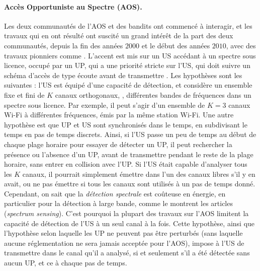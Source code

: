 \begin{resume_fr}
\paragraph{Accès Opportuniste au Spectre (AOS).}
%
Les deux communautés de l'AOS et des bandits ont commencé à interagir, et les travaux qui en ont résulté ont suscité un grand intérêt de la part des deux communautés, depuis la fin des années $2000$ et le début des années $2010$, avec des travaux pionniers comme \cite{Liu08,Zhao10,Jouini09,Jouini10}.
L'accent est mis sur un US accédant à un spectre sous licence, occupé par un UP, qui a une priorité stricte sur l'US, qui doit suivre un schéma d'accès de type \guillemotleft{} écoute avant de transmettre \guillemotright{}.
%
Les hypothèses sont les suivantes :
l'US est équipé d'une capacité de détection,
et considère un ensemble fixe et fini de $K$ canaux orthogonaux, \ie, différentes bandes de fréquences dans un spectre sous licence.
Par exemple, il peut s'agir d'un ensemble de $K=3$ canaux Wi-Fi à différentes fréquences, émis par la même station Wi-Fi.
Une autre hypothèse est que UP et US sont synchronisés dans le temps, en subdivisant le temps en pas de temps discrets.
%
Ainsi, si l'US passe un peu de temps au début de chaque plage horaire pour essayer de détecter un UP, il peut rechercher la présence ou l'absence d'un UP, avant de transmettre pendant le reste de la plage horaire, sans entrer en collision avec l'UP.
Si l'US était capable d'analyser tous les $K$ canaux, il pourrait simplement émettre dans l'un des canaux libres s'il y en avait, ou ne pas émettre si tous les canaux sont utilisés à un pas de temps donné.
%
Cependant, on sait que la \emph{détection spectrale} est coûteuse en énergie, en particulier pour la détection à large bande, comme le montrent les articles \cite{yucek2009survey,subhedar2011spectrum} (\emph{spectrum sensing}). C'est pourquoi la plupart des travaux sur l'AOS limitent la capacité de détection de l'US à un seul canal à la fois.
Cette hypothèse, ainsi que l'hypothèse selon laquelle les UP ne peuvent pas être perturbés (sans laquelle aucune réglementation ne sera jamais acceptée pour l'AOS), impose à l'US de transmettre dans le canal qu'il a analysé, si et seulement s'il a été détectée sans aucun UP, et ce à chaque pas de temps.


\end{resume_fr}
